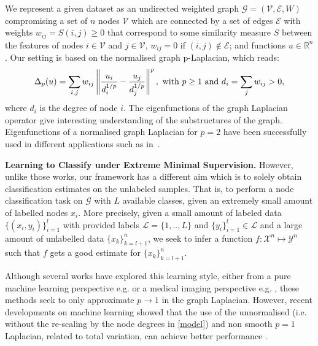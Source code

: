 \documentclass[runningheads]{llncs}
\begin{document}
We represent a given dataset as an undirected weighted graph $\mathcal{G}=(\mathcal{V},\mathcal{E},W)$  compromising a set of $n$ nodes $\mathcal{V}$ which are connected by a set of edges $\mathcal{E}$ with weights $w_{ij}=S(i,j)\geq 0$ that correspond to some similarity measure $S$ between the features of nodes $i \in \mathcal{V}$ and $j \in \mathcal{V}$, $w_{ij}=0$  if  $(i,j)  \notin  \mathcal{E}$; and functions $u\in
\mathbb{R}^{n}$. Our setting is based on the normalised graph p-Laplacian, which reads:
\begin{equation}\label{model}
\Delta_p (u)=\sum_{i,j} w_{ij}\left\| \frac{u_i}{d_i^{1/p}}-\frac{u_j}{d_j^{1/p}}\right\|^p, \vspace{0.5cm} \textnormal{ with } p\geq 1 \textnormal{ and } d_i=\sum_j w_{ij}>0, \vspace{-0.5cm}
\end{equation}
where $d_i$ is the degree of node $i$. The eigenfunctions of the graph Laplacian operator give interesting understanding of the substructures of the graph.  Eigenfunctions of a normalised graph Laplacian for $p=2$ have been successfully used in different applications such as in~\cite{belkin2003Laplacian,chen2013inferring,dodero2014group}.



\smallskip


\textbf{Learning to Classify under Extreme Minimal Supervision.} However, unlike those works, our framework has a different aim which is to solely obtain classification estimates on the unlabeled samples. That is, to perform a node classification task on $\mathcal{G}$ with $L$ available classes, given an extremely small amount of labelled nodes $x_i$. More precisely,  given a small amount of labeled data $\{ (x_i ,y_i) \}_{i=1}^{l}$ with provided labels $\mathcal{L} = \{1,..,L\}$  and $\{y_i\}_{i=1}^{l} \in \mathcal{L}$ and a large amount of unlabelled data  $\{ x_k \}_{k=l+1}^{n}$, we seek to infer a function $f: \mathcal{X}^{n} \mapsto \mathcal{Y}^{n}$ such that $f$ gets a good estimate for  $\{ x_k \}_{k=l+1}^{n}$.


Although several works have explored this learning style, either from a pure machine learning perspective e.g.\cite{zhu2003semi} or a medical imaging perspective e.g. \cite{wang2016progressive}, these methods seek to only approximate $p\to 1$ in the graph Laplacian. However, recent developments on machine learning showed that the use of the unnormalised (i.e. without the re-scaling by the node degrees in  \eqref{model}) and non smooth $p=1$ Laplacian, related to total variation, can achieve better performance \cite{Buhler2009}.
\end{document}
